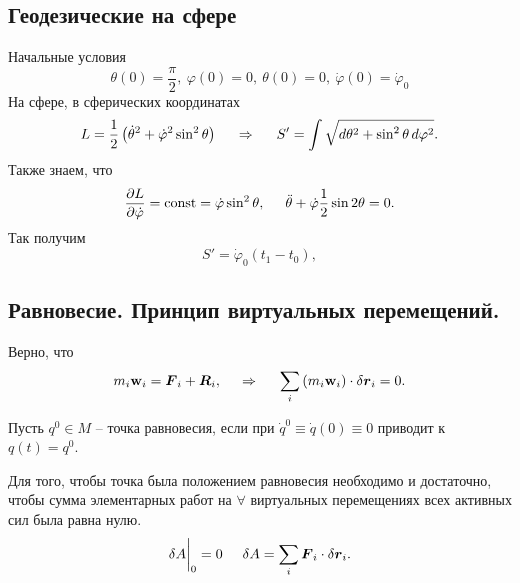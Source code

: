 \subsection{Геодезические на сфере}

Начальные условия
\begin{equation*}
    \theta(0) = \frac{\pi}{2},  \ \varphi(0) = 0, \ \theta(0) = 0, \ \dot{\varphi}(0) = \dot{\varphi}_0
\end{equation*}
На сфере, в сферических координатах
\begin{equation*}
    L = \frac{1}{2} \left(
        \dot{\theta}^2 + \dot{\varphi}^2 \sin^2 \theta
    \right)
    \hspace{0.5cm} \Rightarrow \hspace{0.5cm} 
    S' = \int \sqrt{d \theta^2 + \sin^2 \theta \, d \varphi^2}.
\end{equation*}
Также знаем, что
\begin{equation*}
    \frac{\partial L}{\partial \dot{\varphi}} = \text{const} = \dot{\varphi} \sin^2 \theta,
    \hspace{0.5cm} 
    \ddot{\theta} + \dot{\varphi} \frac{1}{2} \sin 2 \theta  = 0.
\end{equation*}
Так получим
\begin{equation*}
    S' = \dot{\varphi}_0 (t_1 - t_0), 
\end{equation*}


\subsection{Равновесие. Принцип виртуальных перемещений.}


\begin{to_thr} 
Верно, что
\begin{equation*}
    m_i \mbox{\boldmath $\mathrm{w}$}_i = \mbox{\boldmath $F$}_i + \mbox{\boldmath $R$}_i,
    \hspace{0.5cm} \Rightarrow \hspace{0.5cm} 
    \sum_i \left(
        m_i \mbox{\boldmath $\mathrm{w}$}_i
    \right) \cdot \delta \mbox{\boldmath $r$}_i = 0.
\end{equation*}
\end{to_thr}


\begin{to_def} 
    Пусть $q^0 \in M$ -- точка равновесия, если при $\dot{q}^0 \equiv \dot{q}(0) \equiv 0$ приводит к $q(t) = q^0$. 
\end{to_def}

\begin{to_lem} 
    Для того, чтобы точка была положением равновесия необходимо и достаточно, чтобы сумма элементарных работ на $\forall$ виртуальных перемещениях всех активных сил была равна нулю.
    \begin{equation*}
        \delta A \bigg|_0 = 0
        \hspace{0.5cm} 
        \delta A = \sum_i \mbox{\boldmath $F$}_i \cdot \delta \mbox{\boldmath $r$}_i.
    \end{equation*}
\end{to_lem}

